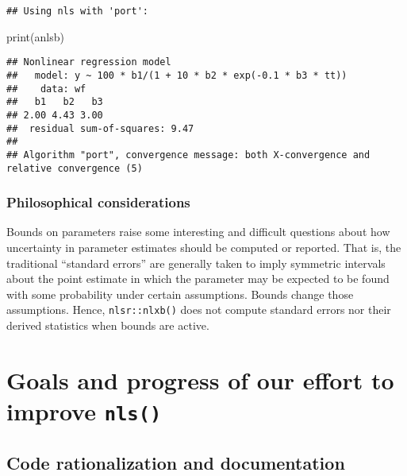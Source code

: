 \documentclass[
]{article}
\newenvironment{Shaded}{\begin{snugshade}}{\end{snugshade}}
\newcommand{\FunctionTok}[1]{\textcolor[rgb]{0.00,0.00,0.00}{#1}}
\newcommand{\NormalTok}[1]{#1}
\begin{document}
\begin{verbatim}
## Using nls with 'port':
\end{verbatim}

\begin{Shaded}
\begin{Highlighting}[]
\FunctionTok{print}\NormalTok{(anlsb)}
\end{Highlighting}
\end{Shaded}

\begin{verbatim}
## Nonlinear regression model
##   model: y ~ 100 * b1/(1 + 10 * b2 * exp(-0.1 * b3 * tt))
##    data: wf
##   b1   b2   b3 
## 2.00 4.43 3.00 
##  residual sum-of-squares: 9.47
## 
## Algorithm "port", convergence message: both X-convergence and relative convergence (5)
\end{verbatim}

\hypertarget{philosophical-considerations}{%
\subsubsection{Philosophical
considerations}\label{philosophical-considerations}}

Bounds on parameters raise some interesting and difficult questions
about how uncertainty in parameter estimates should be computed or
reported. That is, the traditional ``standard errors'' are generally
taken to imply symmetric intervals about the point estimate in which the
parameter may be expected to be found with some probability under
certain assumptions. Bounds change those assumptions. Hence,
\texttt{nlsr::nlxb()} does not compute standard errors nor their derived
statistics when bounds are active.

\hypertarget{goals-and-progress-of-our-effort-to-improve-nls}{%
\section{\texorpdfstring{Goals and progress of our effort to improve
\texttt{nls()}}{Goals and progress of our effort to improve nls()}}\label{goals-and-progress-of-our-effort-to-improve-nls}}

\hypertarget{code-rationalization-and-documentation}{%
\subsection{Code rationalization and
documentation}\label{code-rationalization-and-documentation}}
\end{document}
